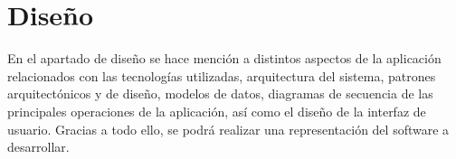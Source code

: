 \chapter{Diseño}

En el apartado de diseño se hace mención a distintos aspectos de la aplicación relacionados con las tecnologías utilizadas, arquitectura del sistema, patrones arquitectónicos y de diseño, modelos de datos, diagramas de secuencia de las principales operaciones de la aplicación, así como el diseño de la interfaz de usuario. Gracias a todo ello, se podrá realizar una representación del software a desarrollar.






